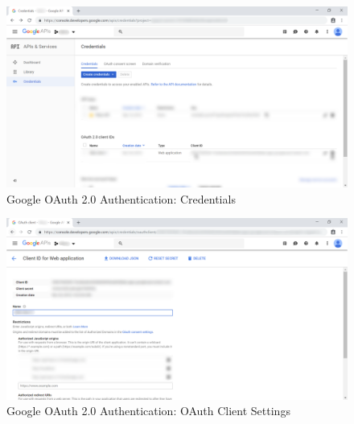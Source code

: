 \begin{enumerate}
	      \begin{center}
	      	\begin{figure}[H]
	      		\centering
	      		\includegraphics[width=0.6\columnwidth]{images/appendixA/Google-OAuth-Credentials.png}
	      		\caption{Google OAuth 2.0 Authentication: Credentials}
	      	\end{figure}
	      \end{center}
	      \begin{center}
	      	\begin{figure}[H]
	      		\centering
	      		\includegraphics[width=0.6\columnwidth]{images/appendixA/Google-OAuth-Settings.png}
	      		\caption{Google OAuth 2.0 Authentication: OAuth Client Settings}
	      	\end{figure}
	      \end{center}
\end{enumerate}
